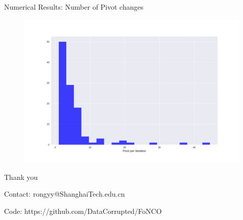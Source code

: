 \documentclass[8pt]{beamer}
\begin{document}
	\begin{frame}[c]{Numerical Results:  Number of Pivot changes }
		\begin{figure}[H]
			\includegraphics[width=\textwidth]{pic/pivot-per-iteration}
		\end{figure}
	\end{frame}

	\begin{frame}[c]
		\centerline{\large{ Thank you}}
		\vfill
		\centerline{\large{Contact: rongyy@ShanghaiTech.edu.cn}}
		\vfill
		\centerline{\large{ Code: https://github.com/DataCorrupted/FoNCO}}
	\end{frame}
\end{document}
